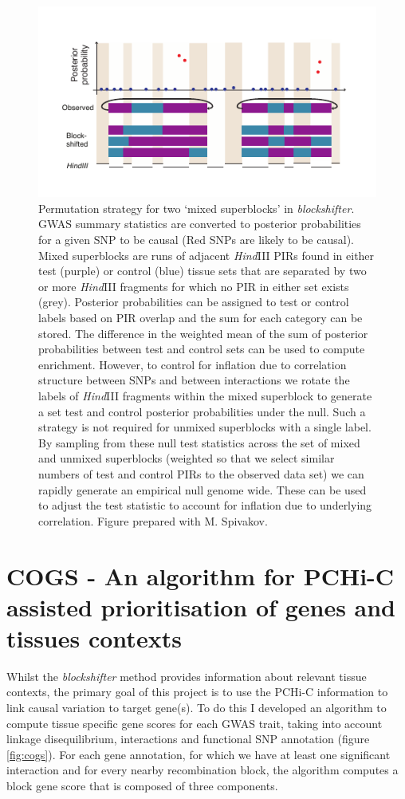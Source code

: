 \documentclass[a4paper,11pt]{report}
\begin{document}
\begin{figure}[h]

\includegraphics[width=\textwidth]{blockshifter.pdf}
\caption{Permutation strategy for two `mixed superblocks' in \textit{blockshifter}. GWAS
summary statistics are converted to posterior probabilities for a given
SNP to be causal (Red SNPs are likely to be causal). Mixed superblocks
are runs of adjacent \textit{Hind}III PIRs  found in either test (purple) or
control (blue) tissue sets that are separated by two or more \textit{Hind}III
fragments for which no PIR in either set exists (grey). Posterior
probabilities can be assigned to test or control labels based on PIR
overlap and the sum for each category can be stored. The difference in
the weighted mean of the sum of posterior probabilities between test and
control sets can be used to compute enrichment.  However, to control for
inflation due to correlation structure between SNPs and between
interactions we rotate the labels of \textit{Hind}III fragments within the mixed
superblock to generate a set test and control posterior probabilities
under the null. Such a strategy is not required for unmixed superblocks
with a single label.  By sampling from these null test statistics across
the set of mixed and unmixed superblocks (weighted so that we select
similar numbers of test and control PIRs to the observed data set)  we
can rapidly generate an empirical null genome wide. These can be used to
adjust the test statistic to account for inflation due to underlying
correlation. Figure prepared with M. Spivakov. }
\label{fig:blockshifter}
\centering
\end{figure}

\section{COGS - An algorithm for PCHi-C assisted prioritisation of genes and tissues contexts}
\label{sect:COGS}
Whilst the \textit{blockshifter} method provides information about relevant tissue contexts, the primary goal of this project is to use the PCHi-C information to link causal variation to target gene(s). To do this
I developed an algorithm to compute tissue specific gene scores for each GWAS trait, taking into account linkage disequilibrium, interactions and functional SNP annotation (figure \ref{fig:cogs}). For each gene annotation, for which we have at least one significant interaction and for every nearby recombination block, the algorithm computes a block gene score that is composed of three components.
\end{document}
